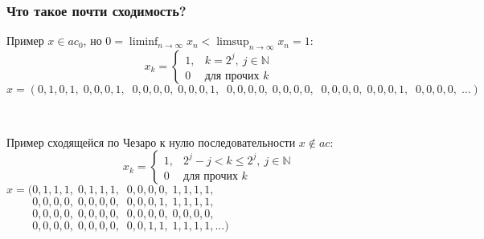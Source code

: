 \documentclass[10pt,pdf,hyperref={unicode},aspectratio=169,color={usenames, dvipsnames}]{beamer}\usepackage{amsmath}
\theoremstyle{definition}
\begin{document}
\begin{frame}
	\frametitle{Что такое почти сходимость?}
	\begin{varwidth}[t]{\linewidth}
		\hspace{3em}
		Пример $x\in ac_0$, но $\displaystyle0=\liminf_{n\to\infty}x_n < \limsup_{n\to\infty}x_n=1$:~~
		$$\displaystyle
			x_k=\begin{cases}
				1, & k=2^j,~j\in\mathbb N
				\\
				0 & \mbox{для прочих~} k
			\end{cases}
		$$
		$x=(0,1,0,1,\;0,0,0,1,\;\;0,0,0,0,\;0,0,0,1,\;\;0,0,0,0,\;0,0,0,0,\;\;0,0,0,0,\;0,0,0,1,\;\;0,0,0,0,\;...)$
	\end{varwidth}
	\\
	\vspace{2em}
	\begin{varwidth}[t]{\linewidth}
		Пример сходящейся по Чезаро к нулю последовательности $x\notin ac$:~~
		$$\displaystyle
			x_k=\begin{cases}
				1, & 2^j-j < k \leq 2^j,~j\in\mathbb N
				\\
				0 & \mbox{для прочих~} k
			\end{cases}
		$$
		$x=(0,1,1,1,\;0,1,1,1,\;\;0,0,0,0,\;1,1,1,1,$\\
		$\phantom{x=(}0,0,0,0,\;0,0,0,0,\;\;0,0,0,1,\;1,1,1,1,$\\
		$\phantom{x=(}0,0,0,0,\;0,0,0,0,\;\;0,0,0,0,\;0,0,0,0,$\\
		$\phantom{x=(}0,0,0,0,\;0,0,0,0,\;\;0,0,1,1,\;1,1,1,1,...)$
	\end{varwidth}
\end{frame}
\end{document}
